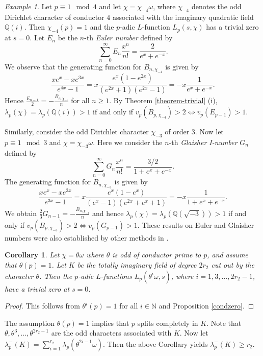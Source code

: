 \documentclass[pdflatex,sn-mathphys-num]{sn-jnl}%
\theoremstyle{plain}
\newtheorem{cor}[thm]{Corollary}
\theoremstyle{definition}
\theoremstyle{remark}
\newtheorem*{exm*}{Example}
\numberwithin{equation}{section}
\newcommand{\QQ}{\mathbb{Q}}
\newcommand{\NN}{\mathbb{N}}
\begin{document}
\begin{exm*} Let $p \equiv 1 \mod 4$ and let $\chi = \chi_{-4} \omega$, where $\chi_{-4}$ denotes the odd Dirichlet character of conductor $4$ associated with the imaginary quadratic field $\QQ(i)$. Then $\chi_{-4}(p)=1$ and
the $p$-adic $L$-function $L_p(s,\chi)$ has a trivial zero at $s=0$.
Let $E_n$ be the $n$-th {\em Euler number}  defined by
$$ \sum_{n=0}^{\infty} E_n \frac{x^n}{n!} = \frac{2}{e^x + e^{-x}} .$$
We observe that the generating function for $B_{n,\chi_{-4}}$ is given by
$$ \frac{ xe^x - xe^{3x}}{e^{4x}-1} = x \frac{e^x( 1-e^{2x})}{(e^{2x}+1)(e^{2x}-1)} = - x \frac{1}{e^x + e^{-x}} .$$
Hence $\frac{E_{n-1}}{2} = - \frac{B_{n,\chi_{-4}}}{n}$ for all $n \geq 1$.
By Theorem \ref{theorem-trivial} (i), $\lambda_p ( \chi) = \lambda_p (\QQ(i)) > 1$ if and only if $v_p (B_{p,\chi_{-4}}) >2  \Longleftrightarrow v_p(E_{p-1}) > 1$. 

Similarly, consider the odd Dirichlet character $\chi_{-3}$ of order $3$. Now let $p \equiv 1 \mod 3$ and $\chi = \chi_{-3} \omega$. Here we consider the $n$-th {\em Glaisher I-number} $G_n$ defined by
$$ \sum_{n=0}^{\infty} G_n \frac{x^n}{n!} = \frac{3/2}{1+e^x + e^{-x}} .$$
The generating function for $B_{n,\chi_{-3}}$ is given by
$$ \frac{ xe^x - xe^{2x}}{e^{3x}-1} = x \frac{e^x( 1-e^{x})}{(e^{x}-1)(e^{2x}+e^x + 1)} = - x \frac{1}{1+e^x + e^{-x}} .$$
We obtain $\frac{2}{3} G_{n-1}= - \frac{B_{n,\chi_{-3}}}{n}$ and hence $\lambda_p ( \chi) = \lambda_p (\QQ(\sqrt{-3})) > 1$ if and only if $v_p (B_{p,\chi_{-3}}) >2  \Longleftrightarrow v_p(G_{p-1}) > 1$.  These results on Euler and Glaisher numbers were also established by other methods in \cite{Sto}.
\end{exm*} 



\begin{cor} Let $\chi = \theta \omega$ where $\theta$ is odd of conductor prime to $p$, and assume that $\theta(p)=1$. Let $K$ be the totally imaginary field of degree $2r_2$ cut out by the character $\theta$. Then the $p$-adic $L$-functions $L_p( \theta^{i} \omega ,s)$, where $ i =1, 3, \dots, 2r_2 -1$, have a trivial zero at $s=0$.
\end{cor}
\begin{proof}  
This follows from $\theta^i (p) = 1$ for all $i \in \NN$ and Proposition \ref{condzero}.
\end{proof}

The assumption $\theta(p)=1$ implies that $p$ splits completely in $K$.
Note that $\theta, \theta^3, \dots, \theta^{2r_2-1}$ are the odd characters associated with $K$. 
Now let $\lambda_p^- (K) = \sum_{i=1}^{r_2} \lambda_p(\theta^{2i-1} \omega)$. Then the above
Corollary yields $\lambda_p^-(K) \geq r_2$. 
\end{document}
